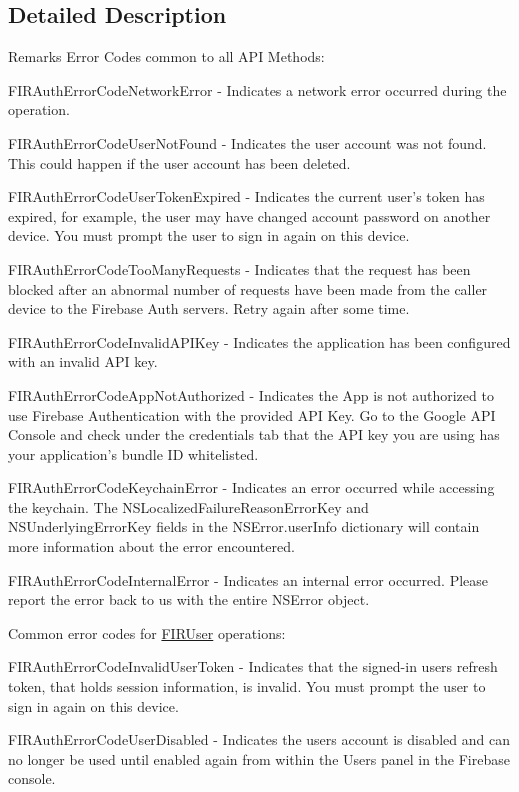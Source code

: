 \subsection{Detailed Description}
\begin{DoxyRemark}{Remarks}
Error Codes common to all A\+P\+I Methods\+:
\begin{DoxyItemize}
\item F\+I\+R\+Auth\+Error\+Code\+Network\+Error -\/ Indicates a network error occurred during the operation.
\item F\+I\+R\+Auth\+Error\+Code\+User\+Not\+Found -\/ Indicates the user account was not found. This could happen if the user account has been deleted.
\item F\+I\+R\+Auth\+Error\+Code\+User\+Token\+Expired -\/ Indicates the current user’s token has expired, for example, the user may have changed account password on another device. You must prompt the user to sign in again on this device.
\item F\+I\+R\+Auth\+Error\+Code\+Too\+Many\+Requests -\/ Indicates that the request has been blocked after an abnormal number of requests have been made from the caller device to the Firebase Auth servers. Retry again after some time.
\item F\+I\+R\+Auth\+Error\+Code\+Invalid\+A\+P\+I\+Key -\/ Indicates the application has been configured with an invalid A\+P\+I key.
\item F\+I\+R\+Auth\+Error\+Code\+App\+Not\+Authorized -\/ Indicates the App is not authorized to use Firebase Authentication with the provided A\+P\+I Key. Go to the Google A\+P\+I Console and check under the credentials tab that the A\+P\+I key you are using has your application’s bundle I\+D whitelisted.
\item F\+I\+R\+Auth\+Error\+Code\+Keychain\+Error -\/ Indicates an error occurred while accessing the keychain. The N\+S\+Localized\+Failure\+Reason\+Error\+Key and N\+S\+Underlying\+Error\+Key fields in the N\+S\+Error.\+user\+Info dictionary will contain more information about the error encountered.
\item F\+I\+R\+Auth\+Error\+Code\+Internal\+Error -\/ Indicates an internal error occurred. Please report the error back to us with the entire N\+S\+Error object. 
\end{DoxyItemize}

Common error codes for \hyperlink{interface_f_i_r_user}{F\+I\+R\+User} operations\+:
\begin{DoxyItemize}
\item F\+I\+R\+Auth\+Error\+Code\+Invalid\+User\+Token -\/ Indicates that the signed-\/in user\textquotesingle{}s refresh token, that holds session information, is invalid. You must prompt the user to sign in again on this device.
\item F\+I\+R\+Auth\+Error\+Code\+User\+Disabled -\/ Indicates the user\textquotesingle{}s account is disabled and can no longer be used until enabled again from within the Users panel in the Firebase console. 
\end{DoxyItemize}
\end{DoxyRemark}


